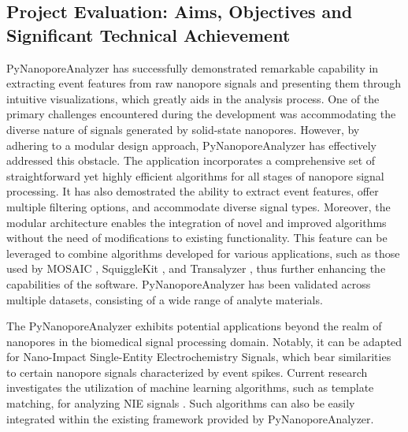 \documentclass[journal]{IEEEtran}
\begin{document}
\subsection{Project Evaluation: Aims, Objectives and Significant Technical Achievement}
PyNanoporeAnalyzer has successfully demonstrated remarkable capability in extracting event features from raw nanopore signals and presenting them through intuitive visualizations, which greatly aids in the analysis process. One of the primary challenges encountered during the development was accommodating the diverse nature of signals generated by solid-state nanopores. However, by adhering to a modular design approach, PyNanoporeAnalyzer has effectively addressed this obstacle. The application incorporates a comprehensive set of straightforward yet highly efficient algorithms for all stages of nanopore signal processing. It has also demostrated the ability to extract event features, offer multiple filtering options, and accommodate diverse signal types. Moreover, the modular architecture enables the integration of novel and improved algorithms without the need of modifications to existing functionality. This feature can be leveraged to combine algorithms developed for various applications, such as those used by MOSAIC \cite{forstaterMOSAICModularSingleMolecule2016}, SquiggleKit \cite{fergusonSquiggleKitToolkitManipulating2019}, and Transalyzer \cite{plesaDataAnalysisMethods2015}, thus further enhancing the capabilities of the software. PyNanoporeAnalyzer has been validated across multiple datasets, consisting of a wide range of analyte materials.

The PyNanoporeAnalyzer exhibits potential applications beyond the realm of nanopores in the biomedical signal processing domain. Notably, it can be adapted for Nano-Impact Single-Entity Electrochemistry Signals, which bear similarities to certain nanopore signals characterized by event spikes. Current research investigates the utilization of machine learning algorithms, such as template matching, for analyzing NIE signals \cite{zhaoAutomatedAnalysisNanoImpact2023}. Such algorithms can also be easily integrated within the existing framework provided by PyNanoporeAnalyzer.
\end{document}

